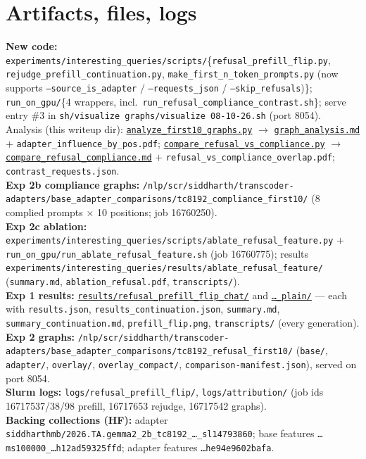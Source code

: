 \documentclass[11pt]{article}
\newcommand{\code}[1]{\texttt{\small #1}}
\begin{document}
\section{Artifacts, files, logs}\label{app:artifacts}
\textbf{New code:} \code{experiments/interesting\_queries/scripts/}\{\code{refusal\_prefill\_flip.py}, \code{rejudge\_prefill\_continuation.py}, \code{make\_first\_n\_token\_prompts.py} (now supports \code{--source\_is\_adapter} / \code{--requests\_json} / \code{--skip\_refusals})\}; \code{run\_on\_gpu/}\{4 wrappers, incl.\ \code{run\_refusal\_compliance\_contrast.sh}\}; serve entry \#3 in \code{sh/visualize graphs/visualize 08-10-26.sh} (port 8054). Analysis (this writeup dir): \href{run:analyze_first10_graphs.py}{\code{analyze\_first10\_graphs.py}} $\to$ \href{run:graph_analysis.md}{\code{graph\_analysis.md}} $+$ \code{adapter\_influence\_by\_pos.pdf}; \href{run:compare_refusal_vs_compliance.py}{\code{compare\_refusal\_vs\_compliance.py}} $\to$ \href{run:compare_refusal_compliance.md}{\code{compare\_refusal\_compliance.md}} $+$ \code{refusal\_vs\_compliance\_overlap.pdf}; \code{contrast\_requests.json}.\\
\textbf{Exp 2b compliance graphs:} \code{/nlp/scr/siddharth/transcoder-adapters/base\_adapter\_comparisons/tc8192\_compliance\_first10/} (8 complied prompts $\times$ 10 positions; job 16760250).\\
\textbf{Exp 2c ablation:} \code{experiments/interesting\_queries/scripts/ablate\_refusal\_feature.py} $+$ \code{run\_on\_gpu/run\_ablate\_refusal\_feature.sh} (job 16760775); results \code{experiments/interesting\_queries/results/ablate\_refusal\_feature/} (\code{summary.md}, \code{ablation\_refusal.pdf}, \code{transcripts/}).\\
\textbf{Exp 1 results:} \href{run:../../../experiments/interesting_queries/results/refusal_prefill_flip_chat}{\code{results/refusal\_prefill\_flip\_chat/}} and \href{run:../../../experiments/interesting_queries/results/refusal_prefill_flip_plain}{\code{\ldots\_plain/}} --- each with \code{results.json}, \code{results\_continuation.json}, \code{summary.md}, \code{summary\_continuation.md}, \code{prefill\_flip.png}, \code{transcripts/} (every generation).\\
\textbf{Exp 2 graphs:} \code{/nlp/scr/siddharth/transcoder-adapters/base\_adapter\_comparisons/tc8192\_refusal\_first10/} (\code{base/}, \code{adapter/}, \code{overlay/}, \code{overlay\_compact/}, \code{comparison-manifest.json}), served on port 8054.\\
\textbf{Slurm logs:} \code{logs/refusal\_prefill\_flip/}, \code{logs/attribution/} (job ids 16717537/38/98 prefill, 16717653 rejudge, 16717542 graphs).\\
\textbf{Backing collections (HF):} adapter \code{siddharthmb/2026.TA.gemma2\_2b\_tc8192\_\ldots\_sl14793860}; base features \code{\ldots ms100000\_\ldots h12ad59325ffd}; adapter features \code{\ldots he94e9602bafa}.
\end{document}
